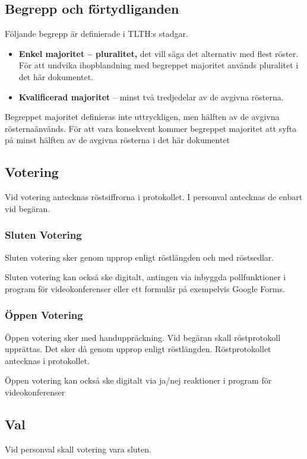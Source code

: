 \documentclass{dsekprotokoll}
\begin{document}
\subsection{Begrepp och förtydliganden}

Följande begrepp är definierade i TLTH:s stadgar.

\begin{itemize}
	\item \textbf{ Enkel majoritet – pluralitet,} det vill säga det alternativ med flest röster. För att undvika
	      ihopblandning med begreppet majoritet används pluralitet i det här dokumentet.
	\item \textbf{Kvalificerad majoritet} – minst två tredjedelar av de avgivna rösterna.

\end{itemize}


Begreppet majoritet definieras inte uttryckligen, men hälften av de avgivna rösternaänvänds.
För att vara konsekvent kommer begreppet majoritet att syfta på minst hälften av de avgivna
rösterna i det här dokumentet
\subsection{Votering}
Vid votering antecknas röstsiffrorna i protokollet. I personval antecknas de enbart vid begäran.

\subsubsection{Sluten Votering}

Sluten votering sker genom upprop enligt röstlängden och med röstsedlar.

Sluten votering kan också ske digitalt, antingen via inbyggda pollfunktioner i program för videokonferenser eller ett formulär på exempelvis Google Forms.

\subsubsection{Öppen Votering}

Öppen votering sker med handuppräckning. Vid begäran skall röstprotokoll upprättas. Det
sker då genom upprop enligt röstlängden. Röstprotokollet antecknas i protokollet.

Öppen votering kan också ske digitalt via ja/nej reaktioner i program för videokonferenser

\subsection{Val}
Vid personval skall votering vara sluten.
\end{document}
